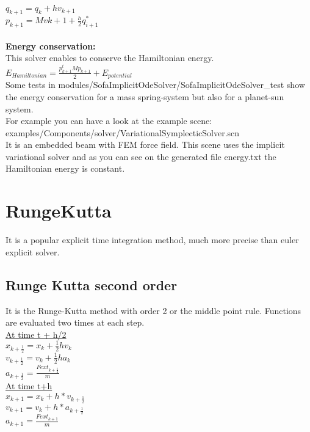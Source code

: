 \documentclass[12pt]{article}
\begin{document}
\begin{doublespace}
\\$q_{k+1} = q_{k} + hv_{k+1}$
\\$ p_{k+1} = Mv{k+1}+\frac{h}{2}q_{i+1}^{*}$
\\ \\ \textbf{Energy conservation:}
\\This solver enables to conserve the Hamiltonian energy. 
\\$E_{Hamiltonian} = \frac{p_{k+1}^{t}Mp_{k+1}}{2} + E_{potential}$
\\Some tests in modules/SofaImplicitOdeSolver/SofaImplicitOdeSolver\_test show the energy conservation for a mass spring-system but also for a planet-sun system.
\\For example you can have a look at the example scene:
\\examples/Components/solver/VariationalSymplecticSolver.scn 
\\It is an embedded beam with FEM force field. This scene uses the implicit variational solver and as you can see on the generated file energy.txt the Hamiltonian energy is constant.
\section{RungeKutta}
It is a popular explicit time integration method, much more precise than euler explicit solver.

\subsection{Runge Kutta second order}
It is the Runge-Kutta method with order 2 or the middle point rule. Functions are evaluated two times at each step.
\\ \underline {At time t + h/2}
\\$ x_{k+\frac{1}{2}} = x_{k}+\frac{1}{2}hv_{k}$
\\$ v_{k+\frac{1}{2}} = v_{k}+\frac{1}{2}ha_{k} $
\\$ a_{k+\frac{1}{2}} = \frac{Fext_{k+\frac{1}{2}}}{m}$
\\ \underline {At time t+h}
\\$x_{k+1} = x_{k}+h*v_{k+\frac{1}{2}}$
\\$v_{k+1} = v_{k}+h*a_{k+\frac{1}{2}}$
\\$a_{k+1} = \frac{Fext_{k+1}}{m}$


\end{doublespace}
\end{document}
